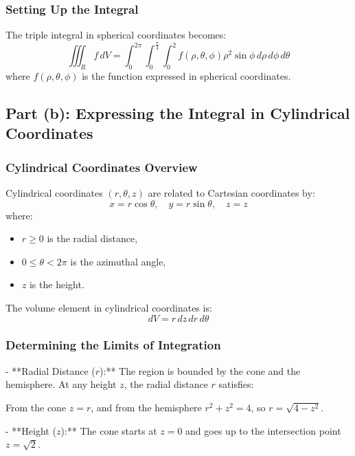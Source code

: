\documentclass[11pt]{article}
\begin{document}
\newpage

\subsubsection{Setting Up the Integral}

The triple integral in spherical coordinates becomes:
\[
\iiint_{R} f \, dV = \int_{0}^{2\pi} \int_{0}^{\frac{\pi}{4}} \int_{0}^{2} f(\rho, \theta, \phi) \rho^2 \sin\phi \, d\rho \, d\phi \, d\theta
\]
where \( f(\rho, \theta, \phi) \) is the function expressed in spherical coordinates.

\newpage

\subsection{Part (b): Expressing the Integral in Cylindrical Coordinates}

\newpage

\subsubsection{Cylindrical Coordinates Overview}
Cylindrical coordinates \((r, \theta, z)\) are related to Cartesian coordinates by:
\[
x = r \cos\theta, \quad y = r \sin\theta, \quad z = z
\]
where:
\begin{itemize}
    \item \( r \geq 0 \) is the radial distance,
    \item \( 0 \leq \theta < 2\pi \) is the azimuthal angle,
    \item \( z \) is the height.
\end{itemize}
The volume element in cylindrical coordinates is:
\[
dV = r \, dz \, dr \, d\theta
\]

\newpage

\subsubsection{Determining the Limits of Integration}

- **Radial Distance (\( r \)):** The region is bounded by the cone and the hemisphere. At any height \( z \), the radial distance \( r \) satisfies:
  
  From the cone \( z = r \), and from the hemisphere \( r^2 + z^2 = 4 \), so \( r = \sqrt{4 - z^2} \).
  
- **Height (\( z \)):** The cone starts at \( z = 0 \) and goes up to the intersection point \( z = \sqrt{2} \).
  
\end{document}

